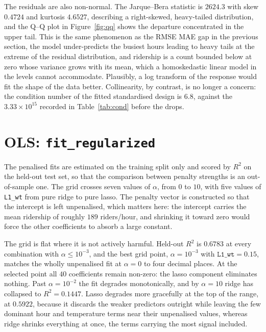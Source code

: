 \documentclass[11pt]{article}
\begin{document}
The residuals are also non-normal. The Jarque--Bera statistic is
$2624.3$ with skew $0.4724$ and kurtosis $4.6527$, describing a
right-skewed, heavy-tailed distribution, and the Q--Q plot in
Figure~\ref{fig:qq} shows the departure concentrated in the upper tail.
This is the same phenomenon as the RMSE MAE gap in the previous
section, the model under-predicts the
busiest hours leading to heavy tails at the extreme of the residual
distribution, and ridership is a count bounded below at zero whose
variance grows with its mean, which a homoskedastic linear model in the
levels cannot accommodate. Plausibly, a log transform of the response would fit
the shape of the data better. Collinearity, by contrast, is no longer a
concern: the condition number of the fitted standardised design is
$6.8$, against the $3.33 \times 10^{15}$ recorded in
Table~\ref{tab:cond} before the drops.

\section{OLS: \texttt{fit\_regularized}}
\label{sec:reg}

The penalised fits are estimated on the training split only and scored
by $R^2$ on the held-out test set, so that the comparison between
penalty strengths is an out-of-sample one. The grid crosses seven
values of $\alpha$, from $0$ to $10$, with five values of
\texttt{L1\_wt} from pure ridge to pure lasso. The penalty vector is
constructed so that the intercept is left unpenalised, which matters
here: the intercept carries the mean ridership of roughly $189$
riders/hour, and shrinking it toward zero would force the other
coefficients to absorb a large constant.




The grid is flat where it is not actively harmful. Held-out $R^2$ is
$0.6783$ at every combination with $\alpha \le 10^{-3}$, and the best
grid point, $\alpha = 10^{-3}$ with $\texttt{L1\_wt} = 0.15$, matches
the wholly unpenalised fit at $\alpha = 0$ to four decimal places. At
the selected point all $40$ coefficients remain non-zero: the lasso
component eliminates nothing. Past $\alpha = 10^{-2}$ the fit degrades
monotonically, and by $\alpha = 10$ ridge has collapsed to $R^2 =
0.1447$. Lasso degrades more gracefully at the top of the range, at
$0.5922$, because it discards the weaker predictors outright while
leaving the few dominant hour and temperature terms near their
unpenalised values, whereas ridge shrinks everything at once, the
terms carrying the most signal included.
\end{document}
